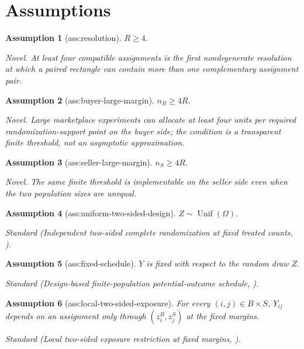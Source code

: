 \documentclass{article}
\newtheorem{assumption}{Assumption}
\begin{document}
\section{Assumptions}

\begin{assumption}[ass:resolution]\label{ass:resolution}
\(R\ge4\).
\par\smallskip\noindent\emph{Novel.} At least four compatible assignments is the first nondegenerate resolution at which a paired rectangle can contain more than one complementary assignment pair.
\end{assumption}

\begin{assumption}[ass:buyer-large-margin]\label{ass:buyer-large-margin}
\(n_B\ge4R\).
\par\smallskip\noindent\emph{Novel.} Large marketplace experiments can allocate at least four units per required randomization-support point on the buyer side; the condition is a transparent finite threshold, not an asymptotic approximation.
\end{assumption}

\begin{assumption}[ass:seller-large-margin]\label{ass:seller-large-margin}
\(n_S\ge4R\).
\par\smallskip\noindent\emph{Novel.} The same finite threshold is implementable on the seller side even when the two population sizes are unequal.
\end{assumption}

\begin{assumption}[ass:uniform-two-sided-design]\label{ass:uniform-two-sided-design}
\(Z\sim\operatorname{Unif}(\Omega)\).
\par\smallskip\noindent\emph{Standard} (Independent two-sided complete randomization at fixed treated counts, \cite{LiuShaikhToulis2026}).
\end{assumption}

\begin{assumption}[ass:fixed-schedule]\label{ass:fixed-schedule}
\(Y\) is fixed with respect to the random draw \(Z\).
\par\smallskip\noindent\emph{Standard} (Design-based finite-population potential-outcome schedule, \cite{BasseFellerToulis2019}).
\end{assumption}

\begin{assumption}[ass:local-two-sided-exposure]\label{ass:local-two-sided-exposure}
For every \((i,j)\in B\times S\), \(Y_{ij}\) depends on an assignment only through \((z_i^B,z_j^S)\) at the fixed margins.
\par\smallskip\noindent\emph{Standard} (Local two-sided exposure restriction at fixed margins, \cite{LiuShaikhToulis2026}).
\end{assumption}
\end{document}
